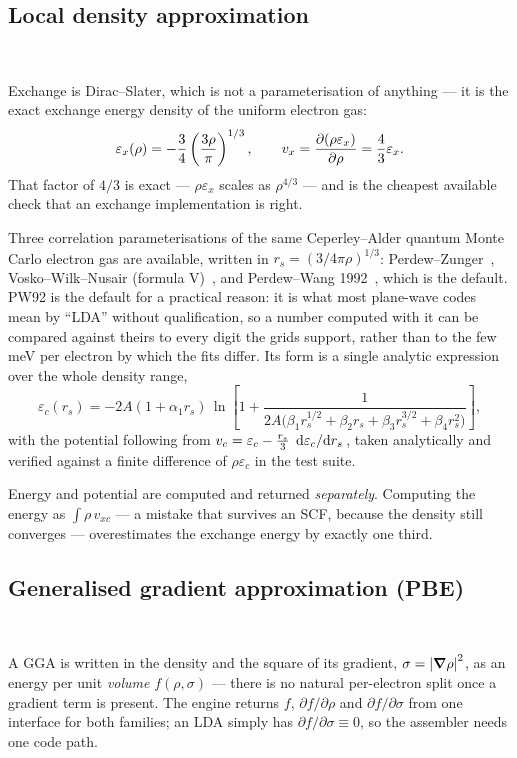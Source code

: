 \documentclass[11pt,a4paper]{article}
\newcommand{\badge}[2]{%
  \par\vspace{2pt}\noindent
  \colorbox{#1}{\textcolor{white}{\small\bfseries\,#2\,}}\par\vspace{4pt}}
\newcommand{\implemented}{\badge{okgreen}{IMPLEMENTED \& VALIDATED}}
\begin{document}
\subsection{Local density approximation}
\label{sec:lda}
\implemented

Exchange is Dirac--Slater, which is not a parameterisation of anything --- it
is the exact exchange energy density of the uniform electron gas:
\begin{equation}
  \varepsilon_x(\rho) = -\frac{3}{4}\left(\frac{3\rho}{\pi}\right)^{1/3},
  \qquad
  v_x = \pdv{(\rho\varepsilon_x)}{\rho} = \frac{4}{3}\varepsilon_x .
\end{equation}
That factor of $4/3$ is exact --- $\rho\varepsilon_x$ scales as $\rho^{4/3}$
--- and is the cheapest available check that an exchange implementation is
right.

Three correlation parameterisations of the same Ceperley--Alder quantum Monte
Carlo electron gas are available, written in
$r_s = (3/4\pi\rho)^{1/3}$: Perdew--Zunger~\cite{pz}, Vosko--Wilk--Nusair
(formula V)~\cite{vwn}, and Perdew--Wang 1992~\cite{pw92}, which is the
default. PW92 is the default for a practical reason: it is what most
plane-wave codes mean by ``LDA'' without qualification, so a number computed
with it can be compared against theirs to every digit the grids support,
rather than to the few meV per electron by which the fits differ. Its form is
a single analytic expression over the whole density range,
\begin{equation}
  \varepsilon_c(r_s) = -2A(1+\alpha_1 r_s)\,
    \ln\!\left[1 + \frac{1}{2A\bigl(\beta_1 r_s^{1/2} + \beta_2 r_s
      + \beta_3 r_s^{3/2} + \beta_4 r_s^{2}\bigr)}\right],
\end{equation}
with the potential following from
$v_c = \varepsilon_c - \tfrac{r_s}{3}\,\dv*{\varepsilon_c}{r_s}$, taken
analytically and verified against a finite difference of $\rho\varepsilon_c$
in the test suite.

Energy and potential are computed and returned \emph{separately}. Computing
the energy as $\int\rho\,v_{xc}$ --- a mistake that survives an SCF, because
the density still converges --- overestimates the exchange energy by exactly
one third.

\subsection{Generalised gradient approximation (PBE)}
\label{sec:pbe}
\implemented

A GGA is written in the density and the square of its gradient,
$\sigma = \abs{\grad\rho}^2$, as an energy per unit \emph{volume}
$f(\rho,\sigma)$ --- there is no natural per-electron split once a gradient
term is present. The engine returns $f$, $\partial f/\partial\rho$ and
$\partial f/\partial\sigma$ from one interface for both families; an LDA
simply has $\partial f/\partial\sigma \equiv 0$, so the assembler needs one
code path.
\end{document}
